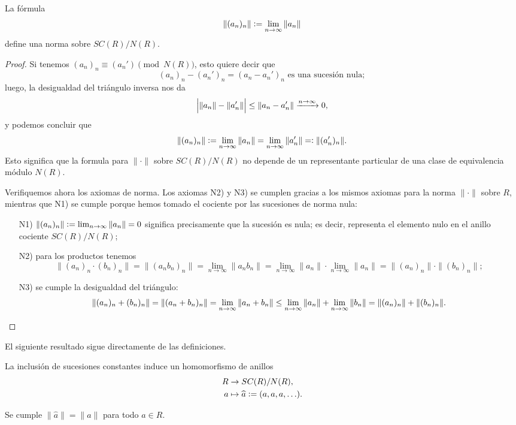 \documentclass{article}
\numberwithin{equation}{section}
\theoremstyle{definition}
\begin{document}
\begin{lema}
  La fórmula
  $$\|(a_n)_n\| \mathrel{\mathop:}= \lim_{n\to\infty} \|a_n\|$$
  define una norma sobre $SC (R) / N (R)$.

  \begin{proof}
    Si tenemos $(a_n)_n \equiv (a_n') \pmod{N (R)}$, esto quiere decir que
    $$(a_n)_n - (a_n')_n = (a_n - a_n')_n \text{ es una sucesión nula};$$
    luego, la desigualdad del triángulo inversa nos da
    $$\Bigl|\|a_n\| - \|a_n'\| \Bigr| \le \|a_n - a_n'\| \xrightarrow{n\to\infty} 0,$$
    y podemos concluir que
    \[ \|(a_n)_n\| \mathrel{\mathop:}= \lim_{n\to\infty} \|a_n\| =
       \lim_{n\to\infty} \|a_n'\| =\mathrel{\mathop:} \|(a_n')_n\|. \]
    Esto significa que la formula para $\|\cdot\|$ sobre $SC(R)/N(R)$ no depende
    de un representante particular de una clase de equivalencia módulo $N (R)$.

    Verifiquemos ahora los axiomas de norma. Los axiomas N2) y N3) se cumplen
    gracias a los mismos axiomas para la norma $\|\cdot\|$ sobre $R$, mientras
    que N1) se cumple porque hemos tomado el cociente por las sucesiones de
    norma nula:
    \begin{enumerate}
    \item[N1)] $\|(a_n)_n\| \mathrel{\mathop:}= \lim_{n\to\infty} \|a_n\| = 0$ significa
      precisamente que la sucesión es nula; es decir, representa el elemento
      nulo en el anillo cociente $SC (R) / N (R)$;

    \item[N2)] para los productos tenemos
      \[ \|(a_n)_n\cdot (b_n)_n\| =
         \|(a_n b_n)_n\| =
         \lim_{n\to\infty} \|a_n b_n\| =
         \lim_{n\to\infty} \|a_n\| \cdot \lim_{n\to\infty} \|a_n\| =
         \|(a_n)_n\|\cdot \|(b_n)_n\|; \]

    \item[N3)] se cumple la desigualdad del triángulo:
      \[ \|(a_n)_n + (b_n)_n\| =
         \|(a_n + b_n)_n\| =
         \lim_{n\to\infty} \|a_n+b_n\| \le
         \lim_{n\to\infty} \|a_n\| + \lim_{n\to\infty} \|b_n\| =
         \|(a_n)_n\| + \|(b_n)_n\|. \qedhere \]
    \end{enumerate}
  \end{proof}
\end{lema}

El siguiente resultado sigue directamente de las definiciones.

\begin{lema}
  La inclusión de sucesiones constantes induce un homomorfismo de anillos
  \begin{align*}
    R & \to SC(R)/N(R),\\
    a & \mapsto \widehat{a} \mathrel{\mathop:}= (a,a,a,\ldots).
  \end{align*}

  Se cumple $\|\widehat{a}\| = \|a\|$ para todo $a\in R$.
\end{lema}
\end{document}
